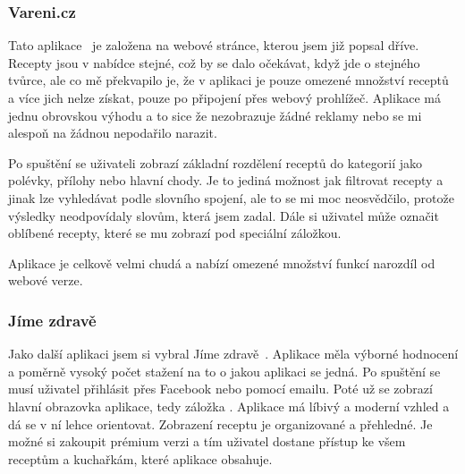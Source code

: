 \subsubsection{Vareni.cz}
Tato aplikace~\cite{VareniCZAplikace} je založena na webové stránce, kterou jsem již popsal dříve. Recepty jsou v nabídce stejné, což by se dalo očekávat,
když jde o stejného tvůrce, ale co mě překvapilo je, že v aplikaci je pouze omezené množství receptů a více jich nelze získat, pouze
po připojení přes webový prohlížeč. Aplikace má jednu obrovskou výhodu a to sice že nezobrazuje žádné reklamy nebo se mi alespoň na
žádnou nepodařilo narazit.

Po spuštění se uživateli zobrazí základní rozdělení receptů do kategorií jako polévky, přílohy nebo hlavní chody. Je to jediná možnost
jak filtrovat recepty a jinak lze vyhledávat podle slovního spojení, ale to se mi moc neosvědčilo, protože výsledky neodpovídaly slovům,
která jsem zadal. Dále si uživatel může označit oblíbené recepty, které se mu zobrazí pod speciální záložkou.

Aplikace je celkově velmi chudá a nabízí omezené množství funkcí narozdíl od webové verze.

\subsubsection{Jíme zdravě}
Jako další aplikaci jsem si vybral Jíme zdravě~\cite{JimeZdrave}. Aplikace měla výborné hodnocení a poměrně vysoký počet stažení na to o jakou aplikaci se jedná.
Po spuštění se musí uživatel přihlásit přes Facebook nebo pomocí emailu. Poté už se zobrazí hlavní obrazovka aplikace, tedy záložka .
Aplikace má líbivý a moderní vzhled a dá se v ní lehce orientovat. Zobrazení receptu je organizované a přehledné. Je možné si zakoupit
prémium verzi a tím uživatel dostane přístup ke všem receptům a kuchařkám, které aplikace obsahuje.

